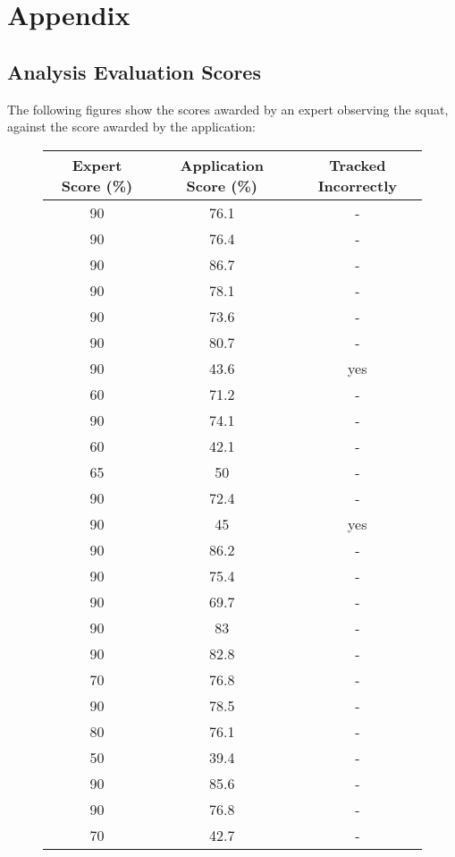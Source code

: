 \section{Appendix}

\subsection{Analysis Evaluation Scores}
\label{sec:analysis_eval_scores}

The following figures show the scores awarded by an expert observing the squat, against the score awarded by the application:

\begin{figure}[H]
    \centering
	\begin{tabular}{ | c | c | c | }
	    \hline
	    \textbf{Expert Score (\%)} & \textbf{Application Score (\%)} & \textbf{Tracked Incorrectly} \\ \hline
	    90 & 76.1 & - \\ \hline
		90 & 76.4 & - \\ \hline
		90 & 86.7 & - \\ \hline
		90 & 78.1 & - \\ \hline
		90 & 73.6 & - \\ \hline
		90 & 80.7 & - \\ \hline
		90 & 43.6 & yes \\ \hline
		60 & 71.2 & - \\ \hline
		90 & 74.1 & - \\ \hline
		60 & 42.1 & - \\ \hline
		65 & 50 & - \\ \hline
		90 & 72.4 & - \\ \hline
		90 & 45 & yes \\ \hline
		90 & 86.2 & - \\ \hline
		90 & 75.4 & - \\ \hline
		90 & 69.7 & - \\ \hline
		90 & 83 & - \\ \hline
		90 & 82.8 & - \\ \hline
		70 & 76.8 & - \\ \hline
		90 & 78.5 & - \\ \hline
		80 & 76.1 & - \\ \hline
		50 & 39.4 & - \\ \hline
		90 & 85.6 & - \\ \hline
		90 & 76.8 & - \\ \hline
		70 & 42.7 & - \\ \hline

\end{tabular}
\end{figure}
